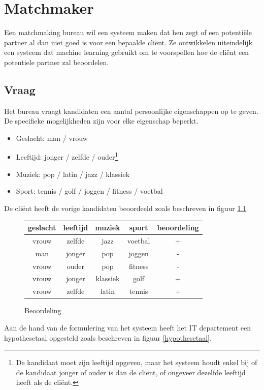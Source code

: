 \documentclass[alternative-exam.tex]{subfiles}
\begin{document}
\chapter{Matchmaker}
Een matchmaking bureau wil een systeem maken dat hen zegt of een potenti\"ele partner al dan niet goed is voor een bepaalde cli\"ent. Ze ontwikkelen uiteindelijk een systeem dat machine learning gebruikt om te voorspellen hoe de cli\"ent een potentiele partner zal beoordelen.

\section{Vraag}
Het bureau vraagt kandidaten een aantal persoonlijke eigenschappen op te geven.
De specifieke mogelijkheden zijn voor elke eigenschap beperkt.
\begin{itemize}
\item Geslacht: man / vrouw
\item Leeftijd: jonger / zelfde / ouder\footnote{De kandidaat moet zijn leeftijd opgeven, maar het systeem houdt enkel bij of de kandidaat jonger of ouder is dan de cli\"ent, of ongeveer dezelfde leeftijd heeft als de cli\"ent.}
\item Muziek: pop / latin / jazz  / klassiek
\item Sport: tennis / golf / joggen / fitness / voetbal
\end{itemize}
De cli\"ent heeft de vorige kandidaten beoordeeld zoals beschreven in figuur \ref{beoordeling}
\begin{figure}[H]
\centering
\caption{Beoordeling}
\label{beoordeling}
\begin{tabular}{|c|c|c|c|c|}
\hline
geslacht & leeftijd & muziek & sport & beoordeling\\
\hline
vrouw & zelfde & jazz & voetbal & +\\
man & jonger & pop & joggen & -\\%
vrouw & ouder & pop & fitness & -\\
vrouw & jonger & klassiek & golf & +\\
vrouw & zelfde & latin & tennis & +\\
\hline
\end{tabular}
\end{figure}
Aan de hand van de formulering van het systeem heeft het IT departement een hypothesetaal opgesteld zoals beschreven in figuur \ref{hypothesetaal}.
\end{document}
